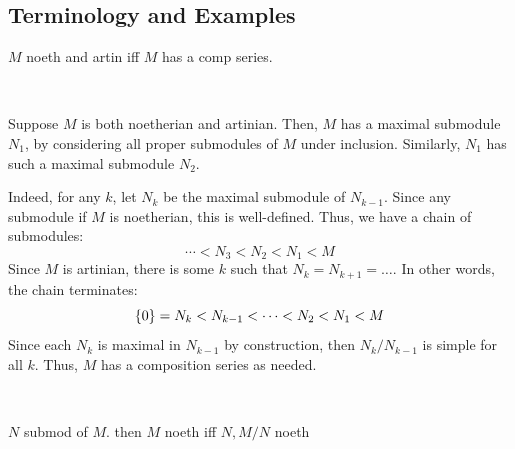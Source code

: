 \subsection{Terminology and Examples}

\begin{thm}[type=Remark,num=1.19]
    $M$ noeth and artin iff $M$ has a comp series.
\end{thm} \

\begin{pf}
	Suppose $M$ is both noetherian and artinian.
	Then, $M$ has a maximal submodule $N_{1}$, by considering all
	proper submodules of $M$ under inclusion.
	Similarly, $N_{1}$ has such a maximal submodule $N_{2}$.

	Indeed, for any $k$, let $N_{k}$ be the maximal submodule of $N_{k-1}$.
	Since any submodule if $M$ is noetherian, this is well-defined.
	Thus, we have a chain of submodules:
	\begin{equation*}
	    \cdots < N_{3} < N_{2} < N_{1} < M
	\end{equation*}
	Since $M$ is artinian, there is some $k$ such that $N_{k}=N_{k+1}=\dots$.
	In other words, the chain terminates:
	\begin{equation*}
		\left\{{0}\right\}=N_{k}<N_{k-1}<\dots<N_{2}<N_{1}<M
	\end{equation*}
	Since each $N_{k}$ is maximal in $N_{k-1}$ by construction, then
	$N_{k}/N_{k-1}$ is simple for all $k$.
	Thus, $M$ has a composition series as needed.
\end{pf} \

\newpage
\begin{thm}[type=Remark,num=1.20]
    $N$ submod of $M$.
	then $M$ noeth iff $N,M/N$ noeth
\end{thm} \

